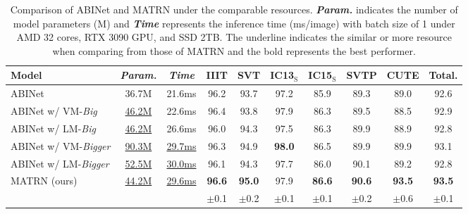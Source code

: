 \documentclass[runningheads]{llncs}
\begin{document}
\begin{table}[t]
\tabcolsep=0.1cm
\caption{Comparison of ABINet and MATRN under the comparable resources. \textbf{\textit{Param.}} indicates the number of model parameters (M) and \textbf{\textit{Time}} represents the inference time (ms/image) with batch size of 1 under AMD 32 cores, RTX 3090 GPU, and SSD 2TB. The underline indicates the similar or more resource when comparing from those of MATRN and the bold represents the best performer.}
\begin{adjustbox}{width=1\linewidth,center}
\label{tab:fair}
\small
\centering
\begin{centering}
\begin{tabular}{l|cc|cccccc|c}
\toprule
 \textbf{Model} & \textbf{\textit{Param.}} & \textbf{\textit{Time}} & IIIT & SVT & IC13$_{\text{S}}$ & IC15$_{\text{S}}$ & SVTP & CUTE & Total. \\
\midrule
 ABINet & 36.7M & 21.6ms & 96.2 & 93.7 & 97.2 & 85.9 & 89.3 & 89.0 & 92.6 \\ \midrule
 ABINet w/ VM-\textit{Big} & \underline{46.2M} & 22.6ms & 96.4 & 93.8 & 97.9 & 86.3 & 89.5 & 88.5 & 92.9  \\
 ABINet w/ LM-\textit{Big} & \underline{46.2M} & 26.6ms & 96.0 & 94.3 & 97.5 & 86.3 & 89.9 & 88.9 & 92.8\\  \midrule
 ABINet w/ VM-\textit{Bigger} & \underline{90.3M} & \underline{29.7ms} & 96.3 & 94.9 & \textbf{98.0} & 86.5 & 89.9 & 89.9 & 93.1 \\ 
 ABINet w/ LM-\textit{Bigger} & \underline{52.5M} & \underline{30.0ms} & 96.1 & 94.3 & 97.7 & 86.0 & 90.1 & 89.2 & 92.8 \\ \midrule
 MATRN (ours) & \underline{44.2M} & \underline{29.6ms} & \textbf{96.6} & \textbf{95.0} & 97.9 & \textbf{86.6} & \textbf{90.6} & \textbf{93.5} & \textbf{93.5} \\
  [-0.3em]
 & & & \scriptsize $\pm$0.1 & \scriptsize $\pm$0.2 & \scriptsize $\pm$0.1 & \scriptsize $\pm$0.1 & \scriptsize $\pm$0.2 & \scriptsize $\pm$0.6 & \scriptsize $\pm$0.1 \\
\bottomrule
\end{tabular}
\end{centering}
\end{adjustbox}
\end{table}
\end{document}
